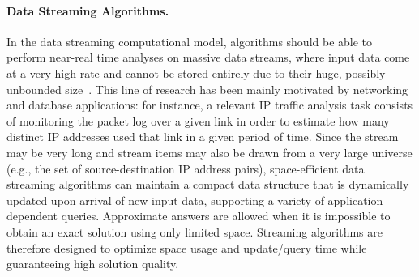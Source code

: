 \paragraph*{Data Streaming Algorithms.} In the data streaming computational model, algorithms should be able to perform near-real time analyses on massive data streams, where input data come at a very high rate and cannot be stored entirely due to their huge, possibly unbounded size~\cite{Demetrescu07,Muthukrishnan05}. This line of research has been mainly motivated by networking and database applications: for instance, a relevant IP traffic analysis task consists of monitoring the packet log over a given link in order to estimate how many distinct IP addresses used that link in a given period of time. Since the stream may be very long and stream items may also be drawn from a very large universe (e.g., the set of source-destination IP address pairs), space-efficient data streaming algorithms can maintain a compact data structure that is dynamically updated upon arrival of new input data, supporting a variety of application-dependent queries. Approximate answers are allowed when it is impossible to obtain an exact solution using only limited space. Streaming algorithms are therefore designed to optimize space usage and update/query time while guaranteeing high solution quality. 




